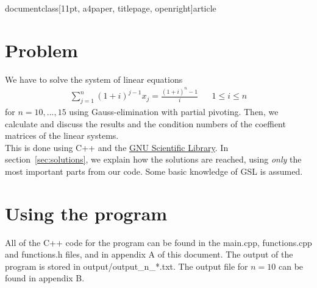 documentclass[11pt, a4paper, titlepage, openright]{article}

\usepackage{amsmath}
\usepackage[font=small,labelfont=bf]{caption}
\usepackage{float}
\usepackage{graphicx}
\usepackage{hyperref}
\usepackage{mathtools}
\usepackage[titletoc, title]{appendix}
\usepackage{listings}
\usepackage{color}
\usepackage{fixltx2e}
\usepackage[bottom]{footmisc}

\usepackage[a4paper, total={6.5in, 9.5in}]{geometry}





\tableofcontents
\newpage

\section{Problem}
    We have to solve the system of linear equations
        \[
            \begin{aligned}
                \sum_{j=1}^{n} (1+i)^{j-1} x_j = \frac{(1+i)^{n} - 1}{i}     && 1 \le i \le n
            \end{aligned}
        \]
    for \( n = 10, ..., 15 \) using Gauss-elimination with partial pivoting.
    Then, we calculate and discuss the results and the condition numbers of the coeffient matrices of the linear systems. \\
    This is done using C++ and the \href{http://www.gnu.org/software/gsl/}{GNU Scientific Library}.
    In section~\ref{sec:solutions}, we explain how the solutions are reached, using \emph{only} the
    most important parts from our code. Some basic knowledge of GSL is assumed.
\bigskip
\bigskip

\section{Using the program}
    All of the C++ code for the program can be found in the main.cpp, functions.cpp and functions.h files, 
    and in appendix A of this document. The output of the program is stored in output/output\_n\_*.txt. The output file for \(n=10\) can be found in appendix B.

